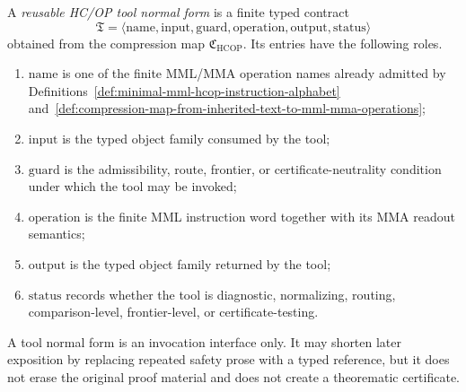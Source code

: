 \begin{definition}
\label{def:first-reusable-hcop-tool-normal-form}
A \emph{reusable HC/OP tool normal form} is a finite typed contract
\[
 \mathfrak T
 =
 \langle
 \mathrm{name},
 \mathrm{input},
 \mathrm{guard},
 \mathrm{operation},
 \mathrm{output},
 \mathrm{status}
 \rangle
\]
obtained from the compression map \(\mathfrak C_{\mathrm{HCOP}}\). Its entries have the following roles.
\begin{enumerate}[leftmargin=2em,label=(\roman*)]
 \item \(\mathrm{name}\) is one of the finite MML/MMA operation names already admitted by Definitions~\ref{def:minimal-mml-hcop-instruction-alphabet} and~\ref{def:compression-map-from-inherited-text-to-mml-mma-operations};
 \item \(\mathrm{input}\) is the typed object family consumed by the tool;
 \item \(\mathrm{guard}\) is the admissibility, route, frontier, or certificate-neutrality condition under which the tool may be invoked;
 \item \(\mathrm{operation}\) is the finite MML instruction word together with its MMA readout semantics;
 \item \(\mathrm{output}\) is the typed object family returned by the tool;
 \item \(\mathrm{status}\) records whether the tool is diagnostic, normalizing, routing, comparison-level, frontier-level, or certificate-testing.
\end{enumerate}
A tool normal form is an invocation interface only. It may shorten later exposition by replacing repeated safety prose with a typed reference, but it does not erase the original proof material and does not create a theorematic certificate.
\end{definition}

